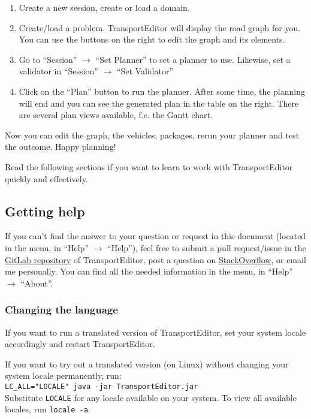 \begin{enumerate}
\item Create a new session, create or load a domain.

\item Create/load a problem. TransportEditor will display the road graph for you.
You can use the buttons on the right to edit the graph and its elements.

\item Go to ``Session'' $\to$ ``Set Planner'' to set a planner to use. Likewise, set a validator in
``Session'' $\to$ ``Set Validator''

\item{Click on the ``Plan'' button to run the planner. After some time, the planning will end and you can
see the generated plan in the table on the right. There are several plan views available, f.e. the Gantt chart.}
\end{enumerate}

Now you can edit the graph, the vehicles, packages, rerun your planner and test the outcome. Happy planning!

Read the following sections if you want to learn to work with TransportEditor quickly and effectively.

\subsection*{Getting help}
If you can't find the answer to your question or request in this document
(located in the menu, in ``Help'' $\to$ ``Help''),
feel free to submit a pull request/issue in
the \href{https://gitlab.com/oskopek/TransportEditor}{GitLab repository} of TransportEditor,
post a question on \href{https://stackoverflow.com}{StackOverflow}, or email me personally.
You can find all the needed information in the menu, in ``Help'' $\to$ ``About''.

\subsubsection*{Changing the language}
If you want to run a translated version of TransportEditor,
set your system locale accordingly and restart TransportEditor.

If you want to try out a translated version (on Linux) without changing your system locale permanently,
run:\\
\verb+LC_ALL="LOCALE" java -jar TransportEditor.jar+\\
Substitute \texttt{LOCALE} for any locale available on your system. To view all available locales,
run \verb+locale -a+.

